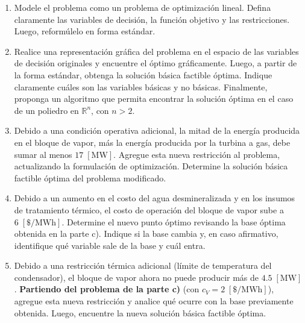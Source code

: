 \begin{enumerate}[label=\alph*)]
    \item Modele el problema como un problema de optimización lineal. Defina
    claramente las variables de decisión, la función objetivo y las
    restricciones. Luego, reformúlelo en forma estándar.

    \item Realice una representación gráfica del problema en el espacio de las
    variables de decisión originales y encuentre el óptimo gráficamente.
    Luego, a partir de la forma estándar, obtenga la solución básica factible
    óptima. Indique claramente cuáles son las variables básicas y no básicas.
    Finalmente, proponga un algoritmo que permita encontrar la solución óptima
    en el caso de un poliedro en $\mathbb{R}^n$, con $n>2$.

    \item Debido a una condición operativa adicional, la mitad de la energía
    producida en el bloque de vapor, más la energía producida por la turbina a
    gas, debe sumar al menos $17\;[\mathrm{MW}]$. Agregue esta nueva
    restricción al problema, actualizando la formulación de optimización.
    Determine la solución básica factible óptima del problema modificado.

    \item Debido a un aumento en el costo del agua desmineralizada y en los
    insumos de tratamiento térmico, el costo de operación del bloque de vapor
    sube a $6\;[\$/\mathrm{MWh}]$. Determine el nuevo punto óptimo revisando la
    base óptima obtenida en la parte c). Indique si la base cambia y, en caso
    afirmativo, identifique qué variable sale de la base y cuál entra.

    \item Debido a una restricción térmica adicional (límite de temperatura del
    condensador), el bloque de vapor ahora no puede producir más de
    $4.5\;[\mathrm{MW}]$. \textbf{Partiendo del problema de la parte c)}
    (con $c_V = 2\;[\$/\mathrm{MWh}]$), agregue esta nueva restricción y
    analice qué ocurre con la base previamente obtenida. Luego, encuentre la
    nueva solución básica factible óptima.
\end{enumerate}

